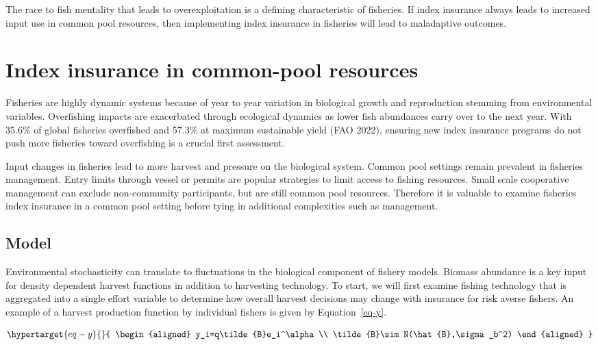 \documentclass[
  letterpaper,
  DIV=11,
  numbers=noendperiod]{scrartcl}
\theoremstyle{plain}
\theoremstyle{plain}
\theoremstyle{remark}
\begin{document}
The race to fish mentality that leads to overexploitation is a defining
characteristic of fisheries. If index insurance always leads to
increased input use in common pool resources, then implementing index
insurance in fisheries will lead to maladaptive outcomes.

\hypertarget{sec-common}{%
\section{Index insurance in common-pool resources}\label{sec-common}}

Fisheries are highly dynamic systems because of year to year variation
in biological growth and reproduction stemming from environmental
variables. Overfishing impacts are exacerbated through ecological
dynamics as lower fish abundances carry over to the next year. With
35.6\% of global fisheries overfished and 57.3\% at maximum sustainable
yield (FAO 2022), ensuring new index insurance programs do not push more
fisheries toward overfishing is a crucial first assessment.

Input changes in fisheries lead to more harvest and pressure on the
biological system. Common pool settings remain prevalent in fisheries
management. Entry limits through vessel or permits are popular
strategies to limit access to fishing resources. Small scale cooperative
management can exclude non-community participants, but are still common
pool resources. Therefore it is valuable to examine fisheries index
insurance in a common pool setting before tying in additional
complexities such as management.

\hypertarget{model}{%
\subsection{Model}\label{model}}

Environmental stochasticity can translate to fluctuations in the
biological component of fishery models. Biomass abundance is a key input
for density dependent harvest functions in addition to harvesting
technology. To start, we will first examine fishing technology that is
aggregated into a single effort variable to determine how overall
harvest decisions may change with insurance for risk averse fishers. An
example of a harvest production function by individual fishers is given
by Equation~\ref{eq-y}.

\begin{equation}\protect\hypertarget{eq-y}{}{
\begin{aligned}
y_i=q\tilde{B}e_i^\alpha\\
\tilde{B}\sim N(\hat{B},\sigma_b^2)
\end{aligned}
}\label{eq-y}\end{equation}
\end{document}
